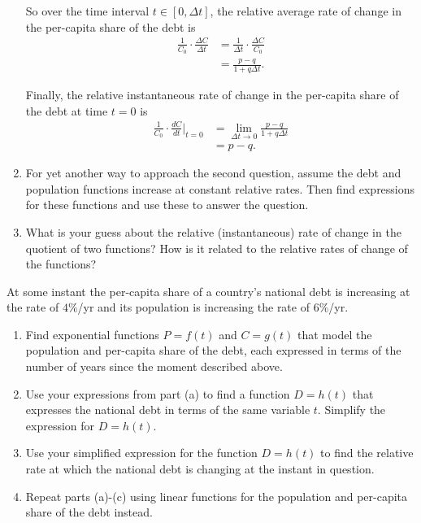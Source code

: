 \documentclass{ximera}
\begin{document}
\begin{question}
\begin{enumerate}
So over the time interval $t\in [0, \Delta t]$, the relative average rate of change in the per-capita share of the debt is
\begin{align*}
 \frac{1}{C_0} \cdot \frac{\Delta C}{\Delta t} &=  \frac{1}{\Delta t} \cdot \frac{\Delta C}{C_0} \\ 
                                                                   &=  \frac{p-q}{1+q\Delta t} .
\end{align*}

Finally, the relative instantaneous rate of change in the per-capita share of the debt at time $t=0$ is
\begin{align*}
 \frac{1}{C_0} \cdot \frac{dC}{dt}\Big|_{t=0} &= \lim_{\Delta t \to 0} \frac{p-q}{1+q\Delta t} \\
                                                 & = p - q .
\end{align*}


\item For yet another way to approach the second question, assume the debt and population functions increase at constant relative rates. Then find expressions for these functions and use these to answer the question.

\item What is your guess about the relative (instantaneous) rate of change in the quotient of two functions? How is it related to the relative rates of change of the functions?
\end{enumerate}
\end{question}


\begin{question} \label{QEPREfver}
At some instant the per-capita share of a country's national debt is increasing at the rate of $4\%$/yr and its population is increasing the rate of $6\%$/yr. 

\begin{enumerate}
\item Find exponential functions $P=f(t)$ and $C = g(t)$ that model the population and per-capita share of the debt, each expressed in terms of the number of years since the moment described above.

\item Use your expressions from part (a) to find a function $D = h(t)$ that expresses the national debt in terms of the same variable $t$. Simplify the expression for $D = h(t)$.

\item Use your simplified expression for the function $D=h(t)$ to find the relative rate at which the national debt is changing at the instant in question.

\item Repeat parts (a)-(c) using linear functions for the population and per-capita share of the debt instead.



\end{enumerate}
\end{question}
\end{document}
